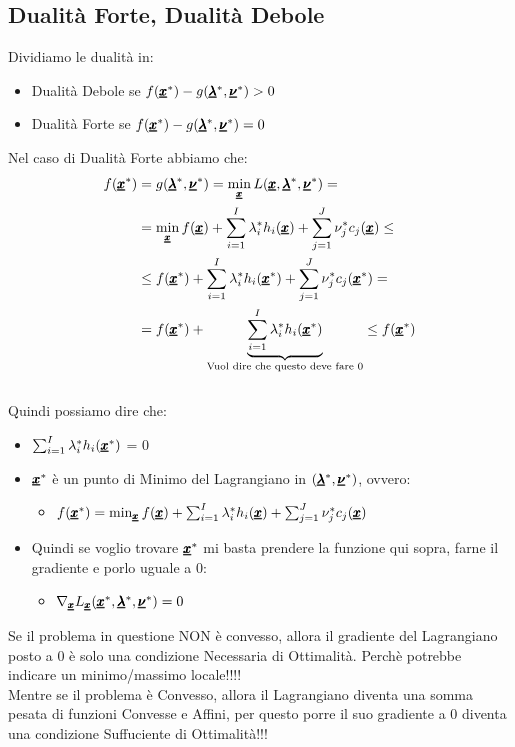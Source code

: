 \subsection{Dualità Forte, Dualità Debole}
Dividiamo le dualità in:
\begin{itemize}
    \item Dualità Debole se $f(\pmb{\underline{x}}^*) - g(\pmb{\underline{\lambda}}^*, \pmb{\underline{\nu}}^*) > 0$
    \item Dualità Forte se $f(\pmb{\underline{x}}^*) - g(\pmb{\underline{\lambda}}^*, \pmb{\underline{\nu}}^*) = 0$
\end{itemize}
Nel caso di Dualità Forte abbiamo che:
\begin{equation*}
\begin{aligned}
        f(\pmb{\underline{x}}^*) &= g(\pmb{\underline{\lambda}}^*, \pmb{\underline{\nu}}^*) = \min_{\pmb{\underline{x}}} L(\pmb{\underline{x}}, \pmb{\underline{\lambda}}^*, \pmb{\underline{\nu}}^*) = \\ 
        &= \min_{\pmb{\underline{x}}} f(\pmb{\underline{x}}) + \sum_{i=1}^I \lambda_i^* h_i(\pmb{\underline{x}}) +  \sum_{j=1}^J \nu_j^* c_j(\pmb{\underline{x}}) \leq \\
        &\leq f(\pmb{\underline{x}}^*) + \sum_{i=1}^I \lambda_i^* h_i(\pmb{\underline{x}}^*) +  \sum_{j=1}^J \nu_j^* c_j(\pmb{\underline{x}}^*) = \\
        &= f(\pmb{\underline{x}}^*) + \underbrace{\sum_{i=1}^I \lambda_i^* h_i(\pmb{\underline{x}}^*)}_{\text{Vuol dire che questo deve fare 0}} \leq f(\pmb{\underline{x}}^*)
\end{aligned}
\end{equation*}
\\ Quindi possiamo dire che:
\begin{itemize}
    \item $\sum_{i=1}^I \lambda_i^* h_i(\pmb{\underline{x}}^*)$ = 0
    \item $\pmb{\underline{x}}^*$ è un punto di Minimo del Lagrangiano in $(\pmb{\underline{\lambda}}^*, \pmb{\underline{\nu}}^*)$, ovvero:
    \begin{itemize}
        \item $f(\pmb{\underline{x}}^*) = \min_{\pmb{\underline{x}}} f(\pmb{\underline{x}}) + \sum_{i=1}^I \lambda_i^* h_i(\pmb{\underline{x}}) +  \sum_{j=1}^J \nu_j^* c_j(\pmb{\underline{x}})$
    \end{itemize}
    \item Quindi se voglio trovare $\pmb{\underline{x}}^*$ mi basta prendere la funzione qui sopra, farne il gradiente e porlo uguale a 0:
    \begin{itemize}
        \item $\nabla_{\pmb{\underline{x}}} L_{\pmb{\underline{x}}}(\pmb{\underline{x}}^*, \pmb{\underline{\lambda}}^*, \pmb{\underline{\nu}}^* ) = 0$
    \end{itemize}
\end{itemize}
\begin{center}
    Se il problema in questione NON è convesso, allora il gradiente del Lagrangiano posto a 0 è solo una condizione Necessaria di Ottimalità. \vspace{10pt}
    Perchè potrebbe indicare un minimo/massimo locale!!!!\\
    Mentre se il problema è Convesso, allora il Lagrangiano diventa una somma pesata di funzioni Convesse e Affini, per questo porre il suo gradiente a 0 diventa una condizione Suffuciente di Ottimalità!!!
\end{center}

